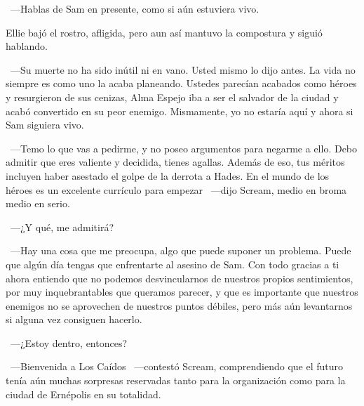 ~---Hablas de Sam en presente, como si aún estuviera vivo.

Ellie bajó el rostro, afligida, pero aun así mantuvo la compostura y siguió hablando.

~---Su muerte no ha sido inútil ni en vano. Usted mismo lo dijo antes. La vida no siempre es como uno la acaba planeando. Ustedes parecían acabados como héroes y resurgieron de sus cenizas, Alma Espejo iba a ser el salvador de la ciudad y acabó convertido en su peor enemigo. Mismamente, yo no estaría aquí y ahora si Sam siguiera vivo.

~---Temo lo que vas a pedirme, y no poseo argumentos para negarme a ello. Debo admitir que eres valiente y decidida, tienes agallas. Además de eso, tus méritos incluyen haber asestado el golpe de la derrota a Hades. En el mundo de los héroes es un excelente currículo para empezar ~---dijo Scream, medio en broma medio en serio.

~---¿Y qué, me admitirá?

~---Hay una cosa que me preocupa, algo que puede suponer un problema. Puede que algún día tengas que enfrentarte al asesino de Sam. Con todo gracias a ti ahora entiendo que no podemos desvincularnos de nuestros propios sentimientos, por muy inquebrantables que queramos parecer, y que es importante que nuestros enemigos no se aprovechen de nuestros puntos débiles, pero más aún levantarnos si alguna vez consiguen hacerlo.

~---¿Estoy dentro, entonces?

~---Bienvenida a Los Caídos ~---contestó Scream, comprendiendo que el futuro tenía aún muchas sorpresas reservadas tanto para la organización como para la ciudad de Ernépolis en su totalidad.

\endinput
